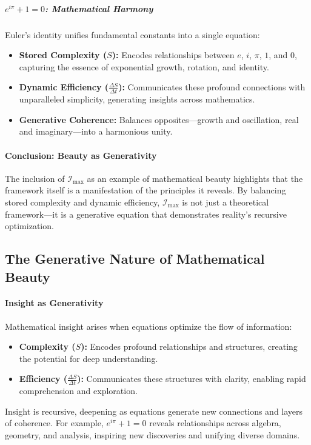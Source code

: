 \documentclass[12pt]{article}
\begin{document}
\subparagraph{\( e^{i\pi} + 1 = 0 \): Mathematical Harmony}
Euler’s identity unifies fundamental constants into a single equation:
\begin{itemize}
    \item \textbf{Stored Complexity (\(S\)):} Encodes relationships between \(e\), \(i\), \(\pi\), \(1\), and \(0\), capturing the essence of exponential growth, rotation, and identity.
    \item \textbf{Dynamic Efficiency (\(\frac{\Delta S}{\Delta t}\)):} Communicates these profound connections with unparalleled simplicity, generating insights across mathematics.
    \item \textbf{Generative Coherence:} Balances opposites—growth and oscillation, real and imaginary—into a harmonious unity.
\end{itemize}

\paragraph{Conclusion: Beauty as Generativity}
The inclusion of \(\mathcal{I}_{\text{max}}\) as an example of mathematical beauty highlights that the framework itself is a manifestation of the principles it reveals. By balancing stored complexity and dynamic efficiency, \(\mathcal{I}_{\text{max}}\) is not just a theoretical framework—it is a generative equation that demonstrates reality’s recursive optimization.

\subsection{The Generative Nature of Mathematical Beauty}

\paragraph{Insight as Generativity}
Mathematical insight arises when equations optimize the flow of information:
\begin{itemize}
    \item \textbf{Complexity (\(S\)):} Encodes profound relationships and structures, creating the potential for deep understanding.
    \item \textbf{Efficiency (\(\frac{\Delta S}{\Delta t}\)):} Communicates these structures with clarity, enabling rapid comprehension and exploration.
\end{itemize}
Insight is recursive, deepening as equations generate new connections and layers of coherence. For example, \( e^{i\pi} + 1 = 0 \) reveals relationships across algebra, geometry, and analysis, inspiring new discoveries and unifying diverse domains.
\end{document}
